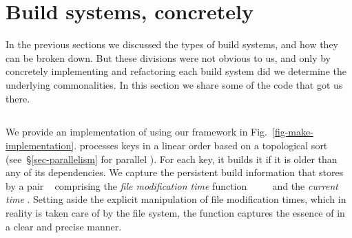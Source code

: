 \section{Build systems, concretely}\label{sec-implementations}

In the previous sections we discussed the types of build systems, and how they
can be broken down. But these divisions were not obvious to us, and only by
concretely implementing and refactoring each build system did we determine the
underlying commonalities. In this section we share some of the code that got us
there.

\subsection{\Make}\label{sec-implementation-make}

We provide an implementation of \Make using our framework in
Fig.~\ref{fig-make-implementation}. \Make processes keys in a linear order based
on a topological sort (see~\S\ref{sec-parallelism} for parallel \Make). For
each key, it builds it if it is older than any of its dependencies. We capture
the persistent build information that \Make stores by a pair
~ comprising the \emph{file modification time} function
~\hs{::}~~\hs{->}~ and the \emph{current time} .
Setting aside the explicit manipulation of file modification times, which in
reality is taken care of by the file system, the function  captures
the essence of \Make in a clear and precise manner.

